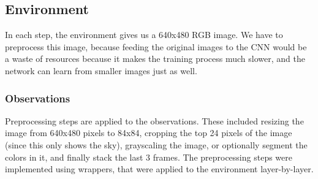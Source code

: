 \documentclass{article}
\begin{document}
\subsection{\normalsize{Environment}}

In each step, the environment gives us a 640x480 RGB image.
We have to preprocess this image, because feeding the original images to the CNN would be a waste of resources because it makes the training process much slower, and the network can learn from smaller images just as well.

\subsubsection{\normalsize{Observations}}

Preprocessing steps are applied to the observations. These included resizing the image from 640x480 pixels to 84x84, cropping the top 24 pixels of the image (since this only shows the sky), grayscaling the image, or optionally segment the colors in it, and finally stack the last 3 frames. The preprocessing steps were implemented using wrappers, that were applied to the environment layer-by-layer.
\end{document}
